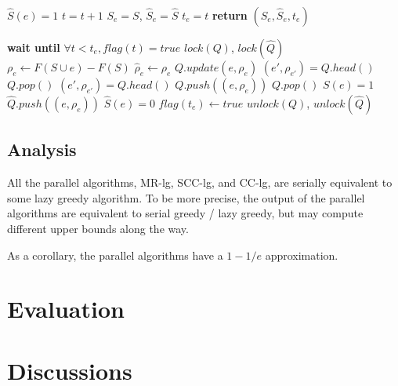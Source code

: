 \documentclass{article}
\newcommand{\mrlz}{MR-lg}
\newcommand{\scclz}{SCC-lg}
\newcommand{\cclz}{CC-lg}
\begin{document}
\begin{algorithm}[tb]
  \caption{$getBounds(e)$}
  \label{alg:cclz:getbound}
\begin{algorithmic}
  \STATE $\widehat{S}(e) = 1$
  \STATE $t = t + 1$
  \STATE $S_e = S$, $\widehat{S}_e = \widehat{S}$
  \STATE $t_e = t$
  \STATE \textbf{return} $(S_e, \widehat{S}_e, t_e)$
\end{algorithmic}
\end{algorithm}


\begin{algorithm}[tb]
  \caption{$commit(e, \rho_e, \widehat\rho_e, t_e)$}
  \label{alg:cclz:commit}
\begin{algorithmic}
  \STATE \textbf{wait until} $\forall t < t_e, flag(t) = true$
  \STATE $lock(Q)$, $lock(\widehat{Q})$
    \STATE $\rho_e         \leftarrow F(S\cup e) - F(S)$
    \STATE $\widehat\rho_e \leftarrow \rho_e$
  \ENDIF
  \STATE $Q.update(e, \rho_e)$
  \STATE $(e', \rho_{e'}) = Q.head()$
    \STATE $Q.pop()$
    \STATE $(e', \rho_{e'}) = Q.head()$
    \STATE $Q.push((e, \rho_e))$
  \ENDIF
    \STATE $Q.pop()$
    \STATE $S(e) = 1$
  \ELSE
    \STATE $\widehat{Q}.push((e, \rho_e))$
    \STATE $\widehat{S}(e) = 0$
  \ENDIF
  \STATE $flag(t_e) \leftarrow true$
  \STATE $unlock(Q)$, $unlock(\widehat{Q})$
\end{algorithmic}
\end{algorithm}





\subsection{Analysis}
All the parallel algorithms, \mrlz{}, \scclz{}, and \cclz{}, are serially equivalent to some lazy greedy algorithm.
To be more precise, the output of the parallel algorithms are equivalent to serial greedy / lazy greedy, but may compute different upper bounds along the way.

As a corollary, the parallel algorithms have a $1-1/e$ approximation.
\section{Evaluation}
\label{sec:evaluation}

\section{Discussions}
\label{sec:discussions}

 




\end{document}
